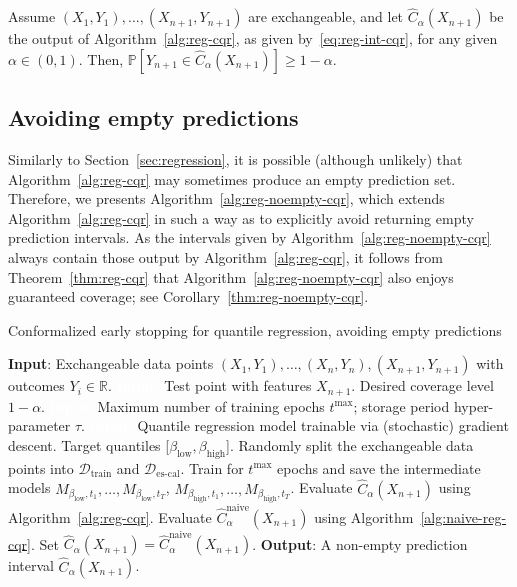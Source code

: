 \addtocounter{theorem}{1}
\begin{theorem} \label{thm:reg-cqr}
Assume $(X_{1},Y_{1}), \ldots, (X_{n+1},Y_{n+1})$ are exchangeable, and let $\hat{C}_{\alpha}(X_{n+1})$ be the output of Algorithm~\ref{alg:reg-cqr}, as given by~\eqref{eq:reg-int-cqr}, for any given $\alpha \in (0,1)$.
Then, $\mathbb{P}[Y_{n+1} \in \hat{C}_{\alpha}(X_{n+1})] \geq 1-\alpha$.
\end{theorem}




\subsection{Avoiding empty predictions} \label{app:reg-noempty-quantile}

Similarly to Section~\ref{sec:regression}, it is possible (although unlikely) that Algorithm~\ref{alg:reg-cqr} may sometimes produce an empty prediction set.
Therefore, we presents Algorithm~\ref{alg:reg-noempty-cqr}, which extends Algorithm~\ref{alg:reg-cqr} in such a way as to explicitly avoid returning empty prediction intervals.
As the intervals given by Algorithm~\ref{alg:reg-noempty-cqr} always contain those output by Algorithm~\ref{alg:reg-cqr}, it follows from Theorem~\ref{thm:reg-cqr} that Algorithm~\ref{alg:reg-noempty-cqr} also enjoys guaranteed coverage; see Corollary~\ref{thm:reg-noempty-cqr}.

\begin{algorithm}[H]
    \caption{Conformalized early stopping for quantile regression, avoiding empty predictions}
    \label{alg:reg-noempty-cqr}
    \begin{algorithmic}[1]
        \STATE \textbf{Input}: Exchangeable data points $(X_{1},Y_{1}), \ldots, (X_{n},Y_{n}), (X_{n+1},Y_{n+1})$ with outcomes $Y_i \in \mathbb{R}$.
        \STATE \textcolor{white}{\textbf{Input}:} Test point with features $X_{n+1}$. Desired coverage level $1-\alpha$.
        \STATE \textcolor{white}{\textbf{Input}:} Maximum number of training epochs $t^{\max}$; storage period hyper-parameter $\tau$.
        \STATE \textcolor{white}{\textbf{Input}:} Quantile regression model trainable via (stochastic) gradient descent. Target quantiles [$\beta_{\text{low}}, \beta_{\text{high}}$].
        \STATE Randomly split the exchangeable data points into $\mathcal{D}_{\text{train}}$ and $\mathcal{D}_{\text{es-cal}}$.
        \STATE Train for $t^{\text{max}}$ epochs and save the intermediate models $M_{\beta_{\text{low}}, t_1} , \dots, M_{\beta_{\text{low}}, t_T}$, $M_{\beta_{\text{high}}, t_1} , \dots, M_{\beta_{\text{high}}, t_T}$.
        \STATE Evaluate $\hat{C}_{\alpha}(X_{n+1})$ using Algorithm~\ref{alg:reg-cqr}.
        \STATE Evaluate $\hat{C}^{\text{naive}}_{\alpha}(X_{n+1})$ using Algorithm~\ref{alg:naive-reg-cqr}. Set $\hat{C}_{\alpha}(X_{n+1}) = \hat{C}^{\text{naive}}_{\alpha}(X_{n+1})$.
        \ENDIF
        \STATE \textbf{Output}: A non-empty prediction interval $\hat{C}_{\alpha}(X_{n+1})$.
    \end{algorithmic}
\end{algorithm}

